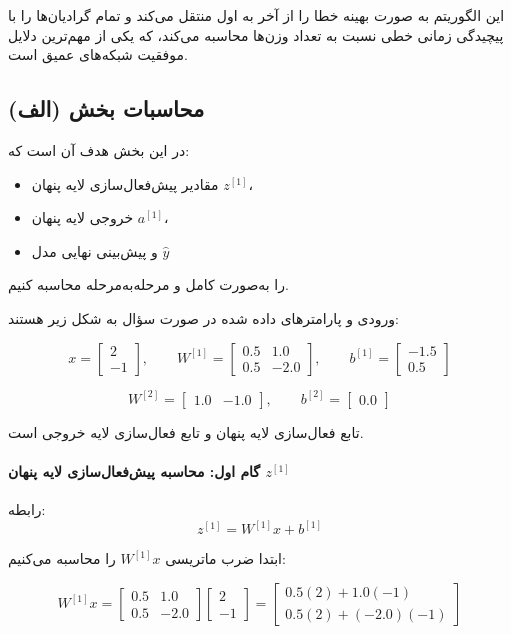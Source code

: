 \documentclass{article}
\begin{document}
این الگوریتم به صورت بهینه خطا را از آخر به اول منتقل می‌کند و تمام گرادیان‌ها را با پیچیدگی زمانی خطی نسبت به تعداد وزن‌ها محاسبه می‌کند، که یکی از مهم‌ترین دلایل موفقیت شبکه‌های عمیق است.



\subsection{محاسبات بخش (الف)}

در این بخش هدف آن است که:
\begin{itemize}
	\item مقادیر پیش‌فعال‌سازی لایه پنهان \(z^{[1]}\)،
	\item خروجی لایه پنهان \(a^{[1]}\)،
	\item و پیش‌بینی نهایی مدل \(\hat{y}\)
\end{itemize}
را به‌صورت کامل و مرحله‌به‌مرحله محاسبه کنیم.

ورودی و پارامترهای داده شده در صورت سؤال به شکل زیر هستند:

\[
x=\begin{bmatrix}
	2 \\ -1
\end{bmatrix},
\qquad
W^{[1]}=
\begin{bmatrix}
	0.5 & 1.0 \\
	0.5 & -2.0
\end{bmatrix},
\qquad
b^{[1]}=
\begin{bmatrix}
	-1.5 \\ 0.5
\end{bmatrix}
\]

\[
W^{[2]}=
\begin{bmatrix}
	1.0 & -1.0
\end{bmatrix},
\qquad
b^{[2]}=
\begin{bmatrix}
	0.0
\end{bmatrix}
\]

تابع فعال‌سازی لایه پنهان  و تابع فعال‌سازی لایه خروجی  است.

\paragraph{گام اول: محاسبه پیش‌فعال‌سازی لایه پنهان \(z^{[1]}\)}

رابطه:
\[
z^{[1]} = W^{[1]} x + b^{[1]}
\]

ابتدا ضرب ماتریسی \(W^{[1]}x\) را محاسبه می‌کنیم:

\[
W^{[1]} x =
\begin{bmatrix}
	0.5 & 1.0 \\
	0.5 & -2.0
\end{bmatrix}
\begin{bmatrix}
	2 \\ -1
\end{bmatrix}
=
\begin{bmatrix}
	0.5(2) + 1.0(-1) \\
	0.5(2) + (-2.0)(-1)
\end{bmatrix}
\]
\end{document}
